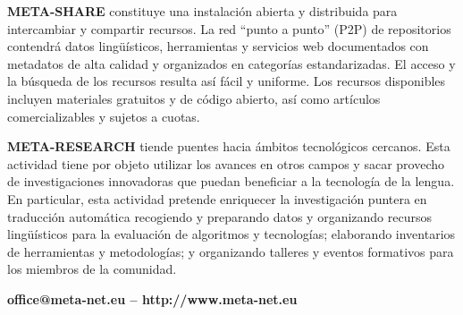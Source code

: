 \begin{multicols}{2}
\textbf{META-SHARE} constituye una instalación abierta y distribuida para intercambiar y compartir recursos. La red ``punto a punto'' (P2P) de repositorios contendrá datos lingüísticos, herramientas y servicios web documentados con metadatos de alta calidad y organizados en categorías estandarizadas. El acceso y la búsqueda de los recursos resulta así fácil y uniforme. Los recursos disponibles incluyen materiales gratuitos y de código abierto, así como artículos comercializables y sujetos a cuotas. 

\textbf{META-RESEARCH} tiende puentes hacia ámbitos tecnológicos cercanos. Esta actividad tiene por objeto utilizar los avances en otros campos y sacar provecho de investigaciones innovadoras que puedan beneficiar a la tecnología de la lengua. En particular, esta actividad pretende enriquecer la investigación puntera en traducción automática recogiendo y preparando datos y organizando recursos lingüísticos para la evaluación de algoritmos y tecnologías; elaborando inventarios de herramientas y metodologías; y organizando talleres y eventos formativos para los miembros de la comunidad.

\centerline{\textbf{office@meta-net.eu -- http://www.meta-net.eu}}
\end{multicols}

\clearpage

\makeatletter
{}
{
  \renewcommand*{\theHsection}{\thepart.\thesection}
}
\makeatother
\setcounter{section}{0}
\setcounter{figure}{0}




